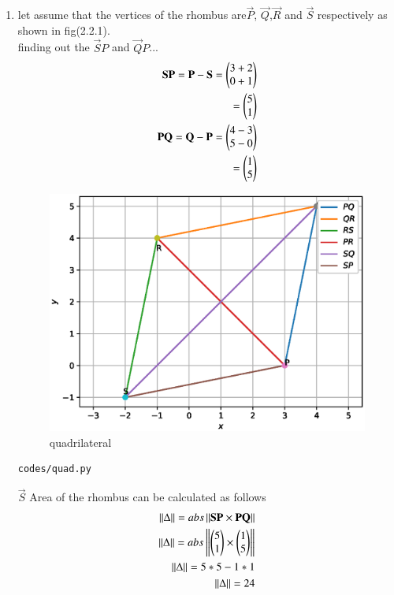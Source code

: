 \renewcommand{\theequation}{\theenumi}
\begin{enumerate}[label=\arabic*.,ref=\thesubsection.\theenumi]

\item let assume that the vertices of the rhombus are$\vec P$, $\vec Q$,$\vec R$ and $\vec S$ respectively as shown in fig(2.2.1).
\\ finding out the $\vec SP$ and $\vec QP$...
\\
\begin{align}
	\mathbf {SP} = \mathbf P - \mathbf S = \begin{pmatrix}3 +2\\0+1\end{pmatrix}
	\\ = \begin{pmatrix}5\\1\end{pmatrix}
	\\
	\mathbf {PQ} = \mathbf Q - \mathbf P = \begin{pmatrix}4-3\\5-0\end{pmatrix}
	\\ = \begin{pmatrix}1\\5\end{pmatrix}
\end{align}

\begin{figure}[!ht]
	\centering
	\includegraphics[width=\columnwidth]{./figures/quad.eps}
	\caption{quadrilateral }
	\label{fig:quadrilateral}
\end{figure}
\begin{lstlisting}
codes/quad.py
\end{lstlisting}

$\vec S$ Area of the rhombus can be calculated as follows 
\\
\begin{align}
	\left\lVert\Delta\right\rVert =abs\left\lVert \mathbf{\mathbf{SP}} \times \mathbf{\mathbf{PQ}}\right\rVert
	\\
	\left\lVert\Delta\right\rVert = abs\left\lVert \mathbf{\begin{pmatrix}5\\1\end{pmatrix}} \times \mathbf{\begin{pmatrix}1\\5\end{pmatrix}}\right\rVert
	\\
	\left\lVert\Delta\right\rVert = 5*5 - 1*1
	\\
	\left\lVert\Delta\right\rVert = 24
\end{align}

\end{enumerate}